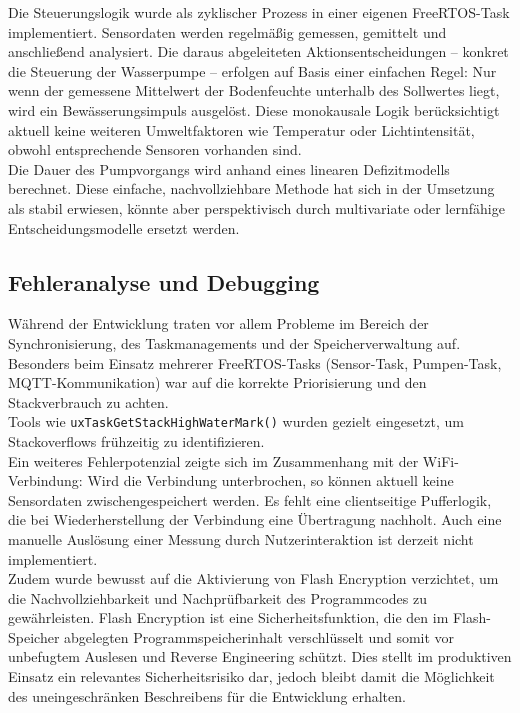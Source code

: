 Die Steuerungslogik wurde als zyklischer Prozess in einer eigenen FreeRTOS-Task implementiert. Sensordaten werden regelmäßig gemessen, gemittelt und anschließend analysiert. Die daraus abgeleiteten Aktionsentscheidungen – konkret die Steuerung der Wasserpumpe – erfolgen auf Basis einer einfachen Regel: Nur wenn der gemessene Mittelwert der Bodenfeuchte unterhalb des Sollwertes liegt, wird ein Bewässerungsimpuls ausgelöst. Diese monokausale Logik berücksichtigt aktuell keine weiteren Umweltfaktoren wie Temperatur oder Lichtintensität, obwohl entsprechende Sensoren vorhanden sind. 
\\
Die Dauer des Pumpvorgangs wird anhand eines linearen Defizitmodells berechnet. Diese einfache, nachvollziehbare Methode hat sich in der Umsetzung als stabil erwiesen, könnte aber perspektivisch durch multivariate oder lernfähige Entscheidungsmodelle ersetzt werden.

\subsection{Fehleranalyse und Debugging}

Während der Entwicklung traten vor allem Probleme im Bereich der Synchronisierung, des Taskmanagements und der Speicherverwaltung auf. Besonders beim Einsatz mehrerer FreeRTOS-Tasks (Sensor-Task, Pumpen-Task, MQTT-Kommunikation) war auf die korrekte Priorisierung und den Stackverbrauch zu achten.\\
Tools wie \texttt{uxTaskGetStackHighWaterMark()} wurden gezielt eingesetzt, um Stackoverflows frühzeitig zu identifizieren.
\\
Ein weiteres Fehlerpotenzial zeigte sich im Zusammenhang mit der WiFi-Verbindung: Wird die Verbindung unterbrochen, so können aktuell keine Sensordaten zwischengespeichert werden. Es fehlt eine clientseitige Pufferlogik, die bei Wiederherstellung der Verbindung eine Übertragung nachholt. Auch eine manuelle Auslösung einer Messung durch Nutzerinteraktion ist derzeit nicht implementiert. 
\\
Zudem wurde bewusst auf die Aktivierung von Flash Encryption verzichtet, um die Nachvollziehbarkeit und Nachprüfbarkeit des Programmcodes zu gewährleisten. Flash Encryption ist eine Sicherheitsfunktion, die den im Flash-Speicher abgelegten Programmspeicherinhalt verschlüsselt und somit vor unbefugtem Auslesen und Reverse Engineering schützt. Dies stellt im produktiven Einsatz ein relevantes Sicherheitsrisiko dar, jedoch bleibt damit die Möglichkeit des uneingeschränken Beschreibens für die Entwicklung erhalten.

